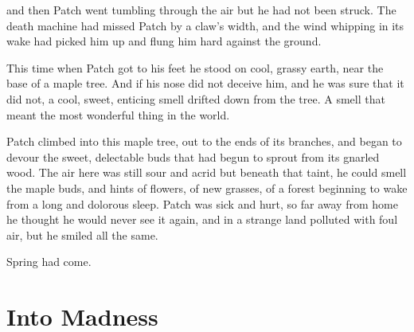 \documentclass[12pt]{book}
\begin{document}
 and then Patch went tumbling through the air %
 but he had not been struck. The death machine had missed Patch by a claw's width, and the wind whipping in its wake had picked him up and flung him hard against the ground.\par
This time when Patch got to his feet he stood on cool, grassy earth, near the base of a maple tree. And if his nose did not deceive him, and he was sure that it did not, a cool, sweet, enticing smell drifted down from the tree. A smell that meant the most wonderful thing in the world.\par
Patch climbed into this maple tree, out to the ends of its branches, and began to devour the sweet, delectable buds that had begun to sprout from its gnarled wood. The air here was still sour and acrid %
 but beneath that taint, he could smell the maple buds, and hints of flowers, of new grasses, of a forest beginning to wake from a long and dolorous sleep. Patch was sick and hurt, so far away from home he thought he would never see it again, and in a strange land polluted with foul air, but he smiled all the same.\par
Spring had come.\par

\section{Into Madness}
\end{document}
